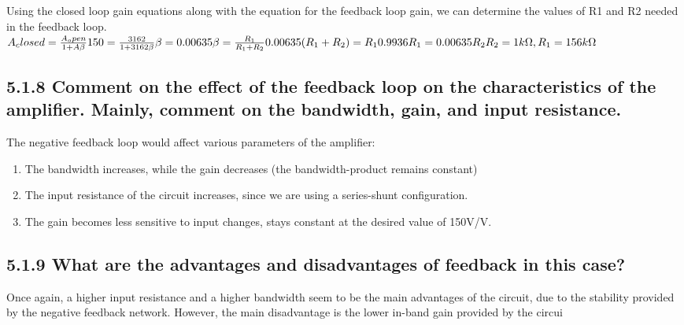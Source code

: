 \documentclass[12pt]{article}
\begin{document}
Using the closed loop gain equations along with the equation for the feedback loop gain, we can determine the values of R1 and R2 needed in the feedback loop.
\newline
$A_closed  = \frac{A_open}{1 + A\beta}\\
\\
150 = \frac{3162}{1 + 3162\beta}\\
\\
\beta = 0.00635\\
\\
\beta = \frac{R_1}{R_1 + R_2}\\
\\
0.00635(R_1 + R_2) = R_1\\
\\
0.9936R_1 = 0.00635R_2\\
\\
R_2 = 1k\Omega, R_1 = 156k\Omega
$

\subsection*{5.1.8 Comment on the effect of the feedback loop on the characteristics of the 
amplifier. Mainly, comment on the bandwidth, gain, and input resistance.}

The negative feedback loop would affect various parameters of the amplifier:
\begin{enumerate}
\item
The bandwidth increases, while the gain decreases (the bandwidth-product remains constant)
\item
The input resistance of the circuit increases, since we are using a series-shunt configuration.
\item
The gain becomes less sensitive to input changes, stays constant at the desired value of 150V/V.
\end{enumerate}

\subsection*{5.1.9 What are the advantages and disadvantages of feedback in this case?}

Once again, a higher input resistance and a higher bandwidth seem to be the main advantages of the circuit, due to the stability provided by the negative feedback network. However, the main disadvantage is the lower in-band gain provided by the circui
\end{document}
